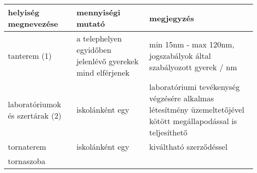 \begin{longtable}[]{@{}lll@{}}
\toprule
\begin{minipage}[b]{0.13\columnwidth}\raggedright
\textbf{helyiség megnevezése}\strut
\end{minipage} & \begin{minipage}[b]{0.26\columnwidth}\raggedright
\textbf{mennyiségi mutató}\strut
\end{minipage} & \begin{minipage}[b]{0.51\columnwidth}\raggedright
\textbf{megjegyzés}\strut
\end{minipage}\tabularnewline
\midrule
\endhead
\begin{minipage}[t]{0.13\columnwidth}\raggedright
tanterem (1)\strut
\end{minipage} & \begin{minipage}[t]{0.26\columnwidth}\raggedright
a telephelyen egyidőben jelenlévő gyerekek mind elférjenek\strut
\end{minipage} & \begin{minipage}[t]{0.51\columnwidth}\raggedright
min 15nm - max 120nm, jogszabályok által szabályozott gyerek / nm\strut
\end{minipage}\tabularnewline
\begin{minipage}[t]{0.13\columnwidth}\raggedright
laboratóriumok és szertárak (2)\strut
\end{minipage} & \begin{minipage}[t]{0.26\columnwidth}\raggedright
iskolánként egy\strut
\end{minipage} & \begin{minipage}[t]{0.51\columnwidth}\raggedright
laboratóriumi tevékenység végzésére alkalmas létesítmény üzemeltetőjével
kötött megállapodással is teljesíthető\strut
\end{minipage}\tabularnewline
\begin{minipage}[t]{0.13\columnwidth}\raggedright
tornaterem\strut
\end{minipage} & \begin{minipage}[t]{0.26\columnwidth}\raggedright
iskolánként egy\strut
\end{minipage} & \begin{minipage}[t]{0.51\columnwidth}\raggedright
kiváltható szerződéssel\strut
\end{minipage}\tabularnewline
\begin{minipage}[t]{0.13\columnwidth}\raggedright
tornaszoba\strut
\end{minipage} & \begin{minipage}[t]{0.26\columnwidth}\raggedright

\end{minipage}
\end{longtable}
